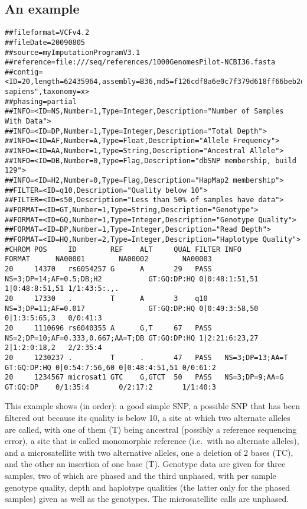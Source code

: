 \documentclass[8pt]{article}
\begin{document}
\subsection{An example}
\scriptsize
\begin{verbatim}
##fileformat=VCFv4.2
##fileDate=20090805
##source=myImputationProgramV3.1
##reference=file:///seq/references/1000GenomesPilot-NCBI36.fasta
##contig=<ID=20,length=62435964,assembly=B36,md5=f126cdf8a6e0c7f379d618ff66beb2da,species="Homo sapiens",taxonomy=x>
##phasing=partial
##INFO=<ID=NS,Number=1,Type=Integer,Description="Number of Samples With Data">
##INFO=<ID=DP,Number=1,Type=Integer,Description="Total Depth">
##INFO=<ID=AF,Number=A,Type=Float,Description="Allele Frequency">
##INFO=<ID=AA,Number=1,Type=String,Description="Ancestral Allele">
##INFO=<ID=DB,Number=0,Type=Flag,Description="dbSNP membership, build 129">
##INFO=<ID=H2,Number=0,Type=Flag,Description="HapMap2 membership">
##FILTER=<ID=q10,Description="Quality below 10">
##FILTER=<ID=s50,Description="Less than 50% of samples have data">
##FORMAT=<ID=GT,Number=1,Type=String,Description="Genotype">
##FORMAT=<ID=GQ,Number=1,Type=Integer,Description="Genotype Quality">
##FORMAT=<ID=DP,Number=1,Type=Integer,Description="Read Depth">
##FORMAT=<ID=HQ,Number=2,Type=Integer,Description="Haplotype Quality">
#CHROM POS     ID        REF    ALT     QUAL FILTER INFO                              FORMAT      NA00001        NA00002        NA00003
20     14370   rs6054257 G      A       29   PASS   NS=3;DP=14;AF=0.5;DB;H2           GT:GQ:DP:HQ 0|0:48:1:51,51 1|0:48:8:51,51 1/1:43:5:.,.
20     17330   .         T      A       3    q10    NS=3;DP=11;AF=0.017               GT:GQ:DP:HQ 0|0:49:3:58,50 0|1:3:5:65,3   0/0:41:3
20     1110696 rs6040355 A      G,T     67   PASS   NS=2;DP=10;AF=0.333,0.667;AA=T;DB GT:GQ:DP:HQ 1|2:21:6:23,27 2|1:2:0:18,2   2/2:35:4
20     1230237 .         T      .       47   PASS   NS=3;DP=13;AA=T                   GT:GQ:DP:HQ 0|0:54:7:56,60 0|0:48:4:51,51 0/0:61:2
20     1234567 microsat1 GTC    G,GTCT  50   PASS   NS=3;DP=9;AA=G                    GT:GQ:DP    0/1:35:4       0/2:17:2       1/1:40:3
\end{verbatim}
\normalsize
This example shows (in order): a good simple SNP, a possible SNP that has been filtered out because its quality is below 10, a site at which two alternate alleles are called, with one of them (T) being ancestral (possibly a reference sequencing error), a site that is called monomorphic reference (i.e.\ with no alternate alleles), and a microsatellite with two alternative alleles, one a deletion of 2 bases (TC), and the other an insertion of one base (T). Genotype data are given for three samples, two of which are phased and the third unphased, with per sample genotype quality, depth and haplotype qualities (the latter only for the phased samples) given as well as the genotypes. The microsatellite calls are unphased.
\end{document}
